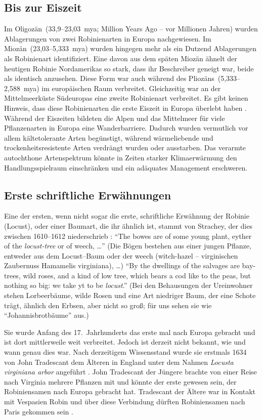 \documentclass[twocolumn]{scrartcl}
\begin{document}
\subsection{Bis zur Eiszeit}

Im Oligozän~(33,9--23,03~mya; Million Years Ago -- vor
Millionen Jahren) wurden Ablagerungen von zwei Robinienarten in
Europa nachgewiesen. Im Miozän~(23,03--5,333~mya) wurden hingegen mehr
als ein Dutzend Ablagerungen als Robinienart identifiziert. Eine davon
aus dem späten Miozän ähnelt der heutigen Robinie Nordamerikas so
stark, dass ihr Beschreiber geneigt war, beide als identisch
anzusehen. Diese Form war auch während des Pliozäns~(5,333--2,588~mya)
im europäischen Raum verbreitet. Gleichzeitig war an der
Mittelmeerküste Südeuropas eine zweite Robinienart verbreitet. Es gibt
keinen Hinweis, dass diese Robinienarten die erste Eiszeit in Europa
überlebt haben \citep{berry1918robinie}. Während der Eiszeiten
bildeten die Alpen und das Mittelmeer für viele Pflanzenarten in
Europa eine Wanderbarriere. Dadurch wurden vermutlich vor allem
kältetolerante Arten begünstigt, während wärmeliebende und
trockenheitsresistente Arten verdrängt wurden oder ausstarben. Das
verarmte autochthone Artenspektrum könnte in Zeiten starker
Klimaerwärmung den Handlungsspielraum einschränken und ein adäquates
Management erschweren.

\subsection{Erste schriftliche Erwähnungen}

Eine der ersten, wenn nicht sogar die erste, schriftliche Erwähnung der Robinie
(Locust), oder einer Baumart, die ihr ähnlich ist, stammt von Strachey, der dies
zwischen 1610--1612 niederschrieb \citep{strachey1610-1612historie}:
\enquote{The bowes are of some young plant, eyther of the \emph{locust-tree} or
of weech, \dots} (Die Bögen bestehen aus einer jungen Pflanze, entweder aus dem
Locust--Baum oder der weech (witch-hazel -- virginischen Zaubernuss Hamamelis
virginiana), \dots) \enquote{By the dwellings of the salvages are bay-trees,
wild roses, and a kind of low tree, which bears a cod like to the peas, but
nothing so big: we take yt to be \emph{locust}.} (Bei den Behausungen der
Ureinwohner stehen Lorbeerbäume, wilde Rosen und eine Art niedriger Baum, der
eine Schote trägt, ähnlich den Erbsen, aber nicht so groß; für uns sehen sie wie
\enquote{Johannisbrotbäume} aus.)

Sie wurde Anfang des 17.~Jahrhunderts das erste mal nach Europa gebracht und ist
dort mittlerweile weit verbreitet. Jedoch ist derzeit nicht bekannt, wie und
wann genau dies war. Nach derzeitigem Wissensstand wurde sie erstmals 1634 von
John Tradescant dem Älteren in England unter dem Nahmen \emph{Locusta virginiana
arbor} angeführt \citep[S.~339]{gunther1922botanists}. John Tradescant der
Jüngere brachte von einer Reise nach Virginia mehrere Pflanzen mit und könnte
der erste gewesen sein, der Robiniensamen nach Europa gebracht hat. Tradescant
der Ältere war in Kontakt mit Vespasien Robin und über diese Verbindung dürften
Robiniensamen nach Paris gekommen sein \citep{bouteiller2019robinie}.
\end{document}

